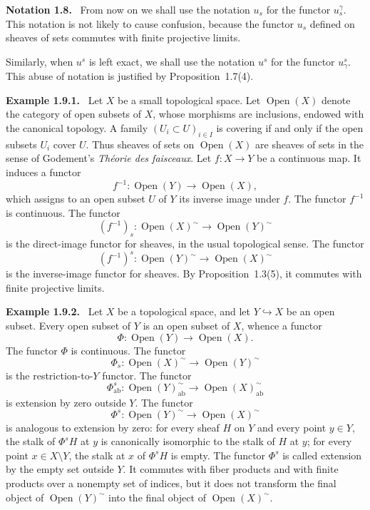 \documentclass[11pt]{article}
\newcommand{\Open}{\operatorname{Open}}
\newenvironment{remarktext}[1]{\par\medskip\noindent\textbf{#1.}\ }{\par\medskip}
\begin{document}
\begin{remarktext}{Notation 1.8}
From now on we shall use the notation \(u_s\) for the functor \(u_s^\gamma\). This notation is not likely to cause confusion, because the functor \(u_s\) defined on sheaves of sets commutes with finite projective limits.
\end{remarktext}

Similarly, when \(u^s\) is left exact, we shall use the notation \(u^s\) for the functor \(u^s_\gamma\). This abuse of notation is justified by Proposition~1.7(4).

\begin{remarktext}{Example 1.9.1}
Let \(X\) be a small topological space. Let \(\Open(X)\) denote the category of open subsets of \(X\), whose morphisms are inclusions, endowed with the canonical topology. A family \((U_i\subset U)_{i\in I}\) is covering if and only if the open subsets \(U_i\) cover \(U\). Thus sheaves of sets on \(\Open(X)\) are sheaves of sets in the sense of Godement's \emph{Th\'eorie des faisceaux}. Let \(f:X\to Y\) be a continuous map. It induces a functor
\[
f^{-1}:\Open(Y)\to\Open(X),
\]
which assigns to an open subset \(U\) of \(Y\) its inverse image under \(f\). The functor \(f^{-1}\) is continuous. The functor
\[
(f^{-1})_s:\Open(X)^{\sim}\to\Open(Y)^{\sim}
\]
is the direct-image functor for sheaves, in the usual topological sense. The functor
\[
(f^{-1})^s:\Open(Y)^{\sim}\to\Open(X)^{\sim}
\]
is the inverse-image functor for sheaves. By Proposition~1.3(5), it commutes with finite projective limits.
\end{remarktext}

\begin{remarktext}{Example 1.9.2}
Let \(X\) be a topological space, and let \(Y\hookrightarrow X\) be an open subset. Every open subset of \(Y\) is an open subset of \(X\), whence a functor
\[
\Phi:\Open(Y)\to\Open(X).
\]
The functor \(\Phi\) is continuous. The functor
\[
\Phi_s:\Open(X)^{\sim}\to\Open(Y)^{\sim}
\]
is the restriction-to-\(Y\) functor. The functor
\[
\Phi^s_{\mathrm{ab}}:\Open(Y)^{\sim}_{\mathrm{ab}}\to\Open(X)^{\sim}_{\mathrm{ab}}
\]
is extension by zero outside \(Y\). The functor
\[
\Phi^s:\Open(Y)^{\sim}\to\Open(X)^{\sim}
\]
is analogous to extension by zero: for every sheaf \(H\) on \(Y\) and every point \(y\in Y\), the stalk of \(\Phi^sH\) at \(y\) is canonically isomorphic to the stalk of \(H\) at \(y\); for every point \(x\in X\setminus Y\), the stalk at \(x\) of \(\Phi^sH\) is empty. The functor \(\Phi^s\) is called extension by the empty set outside \(Y\). It commutes with fiber products and with finite products over a nonempty set of indices, but it does not transform the final object of \(\Open(Y)^{\sim}\) into the final object of \(\Open(X)^{\sim}\).
\end{remarktext}
\end{document}

